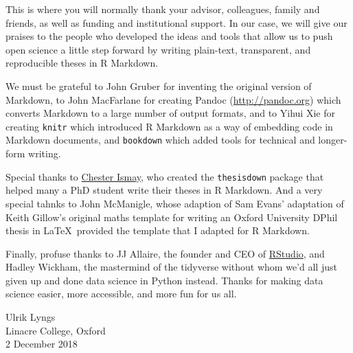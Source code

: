 \documentclass[a4paper, twoside]{templates/ociamthesis}
\begin{document}
\begin{romanpages}

\maketitle


\begin{acknowledgements}
 	This is where you will normally thank your advisor, colleagues, family and friends, as well as funding and institutional support. In our case, we will give our praises to the people who developed the ideas and tools that allow us to push open science a little step forward by writing plain-text, transparent, and reproducible theses in R Markdown.

We must be grateful to John Gruber for inventing the original version of Markdown, to John MacFarlane for creating Pandoc (\url{http://pandoc.org}) which converts Markdown to a large number of output formats, and to Yihui Xie for creating \texttt{knitr} which introduced R Markdown as a way of embedding code in Markdown documents, and \texttt{bookdown} which added tools for technical and longer-form writing.

Special thanks to \href{http://chester.rbind.io}{Chester Ismay}, who created the \texttt{thesisdown} package that helped many a PhD student write their theses in R Markdown. And a very special tahnks to John McManigle, whose adaption of Sam Evans' adaptation of Keith Gillow's original maths template for writing an Oxford University DPhil thesis in \LaTeX~provided the template that I adapted for R Markdown.

Finally, profuse thanks to JJ Allaire, the founder and CEO of \href{http://rstudio.com}{RStudio}, and Hadley Wickham, the mastermind of the tidyverse without whom we'd all just given up and done data science in Python instead. Thanks for making data science easier, more accessible, and more fun for us all.

\begin{flushright}
Ulrik Lyngs \\
Linacre College, Oxford \\
2 December 2018
\end{flushright}
\end{acknowledgements}



\end{romanpages}
\end{document}
